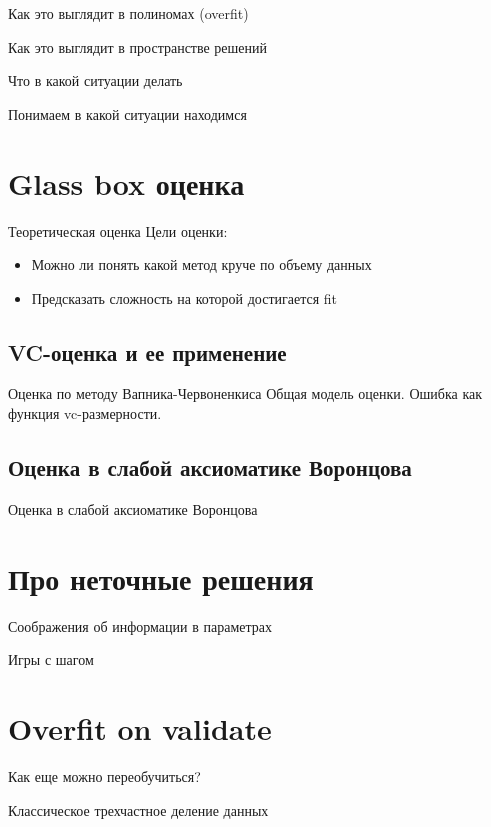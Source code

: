 \documentclass[14pt, fleqn, xcolor={dvipsnames, table}]{beamer}
\begin{document}
\begin{frame}{Как это выглядит в полиномах (overfit)}
\end{frame}

\begin{frame}{Как это выглядит в пространстве решений}
\end{frame}

\begin{frame}{Что в какой ситуации делать}
\end{frame}

\begin{frame}{Понимаем в какой ситуации находимся}
\end{frame}

\section{Glass box оценка}
\begin{frame}{Теоретическая оценка}
Цели оценки:
\begin{itemize}
  \item Можно ли понять какой метод круче по объему данных
  \item Предсказать сложность на которой достигается fit
\end{itemize}
\end{frame}

\subsection{VC-оценка и ее применение}
\begin{frame}{Оценка по методу Вапника-Червоненкиса}
Общая модель оценки.
Ошибка как функция vc-размерности.
\end{frame}

\subsection{Оценка в слабой аксиоматике Воронцова}
\begin{frame}{Оценка в слабой аксиоматике Воронцова}
\end{frame}

\section{Про неточные решения}
\begin{frame}{Соображения об информации в параметрах}
\end{frame}

\begin{frame}{Игры с шагом}
\end{frame}

\section{Overfit on validate}
\begin{frame}{Как еще можно переобучиться?}
\end{frame}

\begin{frame}{Классическое трехчастное деление данных}
\end{frame}
\end{document}
